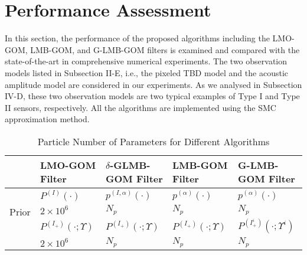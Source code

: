 \documentclass[journal]{IEEEtran}
\begin{document}
{ \section{Performance Assessment}\label{chp:7}
 In this section,  the performance of the  proposed algorithms including the LMO-GOM,  LMB-GOM, and G-LMB-GOM filters is examined and compared with the state-of-the-art in comprehensive numerical experiments. The two observation models listed in Subsection II-E, i.e., the pixeled TBD model and the acoustic amplitude model are considered in our experiments.  As we  analysed in Subsection IV-D, these two observation models are two typical examples of Type I and Type II sensors, respectively.  All the algorithms are implemented using the SMC approximation method. 


\begin{table}
\caption{ Particle Number of  Parameters for  Different Algorithms}
\begin{tabular}{p{0.85cm}|p{1.375cm}|p{1.375cm}|p{1.375cm}|p{1.375cm}}
\hline\hline
$\,$&
LMO-GOM Filter & $\delta$-GLMB-GOM Filter&LMB-GOM Filter& G-LMB-GOM Filter\\
\hline
\multirow{3}{*}{Prior} 
&  $P^{(I)}(\cdot)$ & $p^{(I,\alpha)}(\cdot)$ & $p^{(\alpha)}(\cdot)$ & $p^{(\alpha)}(\cdot)$ \\
\cline{2-5}
& $2\times10^{6}$ & $N_{p}$ & $N_{p}$ &$N_{p}$ \\
\hline
\multirow{3}{*}{Posterior} 
&  $P^{(I_{+})}(\cdot;\Upsilon)$ & $P^{(I_{+})}(\cdot;\Upsilon)$ & $P^{(I_{+})}(\cdot;\Upsilon)$ & $P^{(I^{i}_{+})}(\cdot;\Upsilon^{i})$ \\
\cline{2-5}
& $2\times10^{6}$ & $N_{p}$ & $N_{p}$ & $N_{p}$ \\
\hline
\end{tabular}
\end{table}

}
\end{document}
